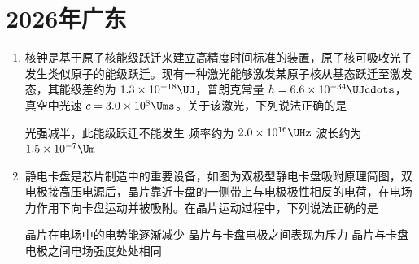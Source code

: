 \documentclass[\gkver]{gaokaozhenti}
\begin{document}
\chapter{2026年广东}

\begin{enumerate}
\item
核钟是基于原子核能级跃迁来建立高精度时间标准的装置，原子核可吸收光子发生类似原子的能级跃迁。现有一种激光能够激发某原子核从基态跃迁至激发态，其能级差约为 $1.3\times10^{-18}\UJ$，普朗克常量 $h=6.6\times10^{-34}\UJcdots$，真空中光速 $c=3.0\times10^{8}\Ums$。关于该激光，下列说法正确的是 

{光强减半，此能级跃迁不能发生}
{频率约为 $2.0\times10^{16}\UHz$}
{波长约为 $1.5\times10^{-7}\Um$}


\item
静电卡盘是芯片制造中的重要设备，如图为双极型静电卡盘吸附原理简图，双电极接高压电源后，晶片靠近卡盘的一侧带上与电极极性相反的电荷，在电场力作用下向卡盘运动并被吸附。在晶片运动过程中，下列说法正确的是 

{晶片在电场中的电势能逐渐减少}
{晶片与卡盘电极之间表现为斥力}
{晶片与卡盘电极之间电场强度处处相同}


\end{enumerate}
\end{document}
